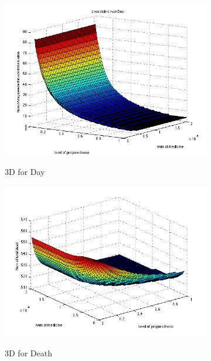 \documentclass[12pt,a4paper,titlepage]{article}
\begin{document}
\begin{figure}[htbp]
  	\centering
  	\begin{subfigure}[b]{0.45\textwidth}
      	\includegraphics[width=\textwidth]{figures/imgpMedDay1.png}
      	\label{figure_3dDay1}
      	\caption{3D for Day}
  	\end{subfigure}
  	\begin{subfigure}[b]{0.45\textwidth}
      	\includegraphics[width=\textwidth]{figures/imgpMedDeath1.png}
      	\label{figure_3dDeath1}
      	\caption{3D for Death}
  	\end{subfigure}
  	\begin{subfigure}[b]{0.45\textwidth}

\end{subfigure}
\end{figure}
\end{document}
